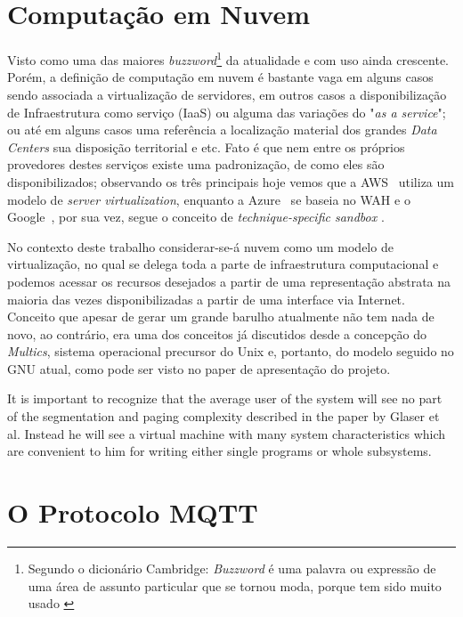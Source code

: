 \section{Computação em Nuvem}

Visto como uma das maiores \textit{buzzword}\footnote{Segundo o dicionário Cambridge: \textit{Buzzword} é uma palavra ou expressão de uma 
área de assunto particular que se tornou moda, porque tem sido muito usado \cite{buzzword-cam}} da atualidade e com uso 
ainda crescente. Porém, a definição de computação em nuvem é bastante vaga \cite{artigo-nuvem} em alguns casos sendo 
associada a virtualização de servidores, em outros casos a disponibilização de Infraestrutura como serviço (\ac{IaaS}) ou 
alguma das variações do "\textit{as a service}"; ou até em alguns casos uma referência a localização material dos grandes
\textit{Data Centers} sua disposição territorial e etc. Fato é que nem entre os próprios provedores destes serviços 
existe uma padronização, de como eles são disponibilizados; observando os três principais hoje vemos que a AWS\textregistered~
utiliza um modelo de \textit{server virtualization}, enquanto a Azure\textregistered~ se baseia no \ac{WAH} e o Google\textregistered~, por sua vez, segue o 
conceito de \textit{technique-specific sandbox} \cite{artigo-nuvem}.

No contexto deste trabalho considerar-se-á nuvem como um modelo de virtualização, no qual se delega toda a parte de 
infraestrutura computacional e podemos acessar os recursos desejados a partir de uma representação abstrata na maioria 
das vezes disponibilizadas a partir de uma interface via Internet. Conceito que apesar de gerar um grande barulho atualmente
não tem nada de novo, ao contrário, era uma dos conceitos já discutidos desde a concepção do \textit{Multics}, sistema 
operacional precursor do Unix e, portanto, do modelo seguido no GNU atual, como pode ser visto no paper de apresentação 
do projeto.

\begin{citacao}
It is important to recognize that the average user of the system will see no part of the segmentation and paging 
complexity described in the paper by Glaser et al. Instead he will see a virtual machine with many system characteristics 
which are convenient to him for writing either single programs or whole subsystems. \cite{multics-paper}
\end{citacao}

\section{O Protocolo MQTT}

